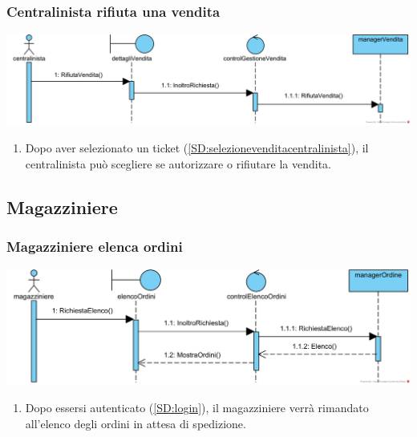 \documentclass[12pt,a4paper]{article}
\begin{document}
\subsubsection{Centralinista rifiuta una vendita}
\label{SD:centralinistaautorizza}
\begin{center}
\includegraphics[width=\textwidth]{SequenceDiagram/CentralinistaRifiutaVendita}
\end{center}

\begin{enumerate}
\item Dopo aver selezionato un ticket (\ref{SD:selezionevenditacentralinista}), il centralinista può scegliere se autorizzare o rifiutare la vendita.
\end{enumerate}

\newpage

\subsection{Magazziniere}
\subsubsection{Magazziniere elenca ordini}
\label{SD:magazzinierevisualizzaelenco}
\begin{center}
\includegraphics[width=\textwidth]{SequenceDiagram/MagazziniereVisualizzaElenco}
\end{center}

\begin{enumerate}
\item Dopo essersi autenticato (\ref{SD:login}), il magazziniere verrà rimandato all'elenco degli ordini in attesa di spedizione.
\end{enumerate}
\end{document}
